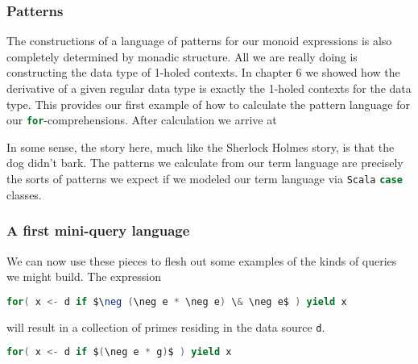 \subsubsection{Patterns}

The constructions of a language of patterns for our monoid expressions
is also completely determined by monadic structure. All we are really
doing is constructing the data type of 1-holed contexts. In chapter 6
we showed how the derivative of a given regular data type is exactly
the 1-holed contexts for the data type. This provides our first
example of how to calculate the pattern language for our
\lstinline[language=Scala,mathescape=true]!for!-comprehensions. After
calculation we arrive at


In some sense, the story here, much like the Sherlock Holmes story, is
that the dog didn't bark. The patterns we calculate from our term
language are precisely the sorts of patterns we expect if we modeled
our term language via \texttt{Scala}
\lstinline[language=Scala,mathescape=true]!case! classes.

\subsubsection{A first mini-query language}

We can now use these pieces to flesh out some examples of the kinds of
queries we might build. The expression

\begin{lstlisting}[language=Scala,mathescape=true]
  for( x <- d if $\neg (\neg e * \neg e) \& \neg e$ ) yield x
\end{lstlisting}

will result in a collection of primes residing in the data source
\lstinline[language=Scala,mathescape=true]!d!.

\begin{lstlisting}[language=Scala,mathescape=true]
  for( x <- d if $(\neg e * g)$ ) yield x
\end{lstlisting}

